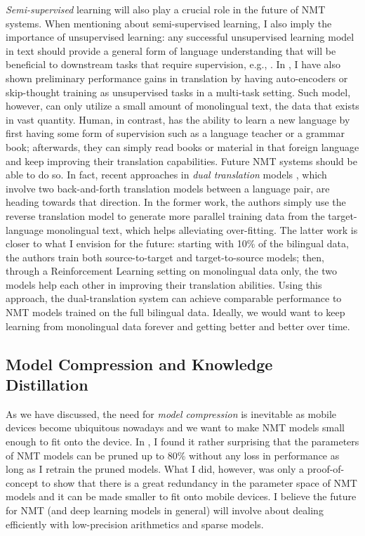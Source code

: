{\it Semi-supervised} learning will also play a crucial role in the future of NMT systems. When mentioning about semi-supervised learning, I also imply the importance of unsupervised learning: any successful unsupervised learning model in text should provide a general form of language understanding that will be beneficial to downstream tasks that require supervision, e.g., \cite{dai15}.
In , I have also shown preliminary performance gains in translation by having auto-encoders or skip-thought training as unsupervised tasks in a multi-task setting. Such model, however, can only utilize a small amount of monolingual text, the data that exists in vast quantity. Human, in contrast, has the ability to learn a new language by first having some form of supervision such as a language teacher or a grammar book; afterwards, they can simply read books or material in that foreign language and keep improving their translation capabilities. Future NMT systems should be able to do so. In fact, recent approaches in {\it dual translation} models \cite{sennrich16mono,xia16}, which involve two back-and-forth translation models between a language pair, are heading towards that direction. In the former work, the authors simply use the reverse translation model to generate more parallel training data from the target-language monolingual text, which helps alleviating over-fitting. The latter work is closer to what I envision for the future: starting with 10\% of the bilingual data, the authors train both source-to-target and target-to-source models; then, through a Reinforcement Learning setting on monolingual data only, the two models help each other in improving their translation abilities. Using this approach, the dual-translation system can achieve comparable performance to NMT models trained on the full bilingual data. Ideally, we would want to keep learning from monolingual data forever and getting better and better over time.

\subsection{Model Compression and Knowledge Distillation}
As we have discussed, the need for {\it model compression} is inevitable as mobile devices become ubiquitous nowadays and we want to make NMT models small enough to fit onto the device. In , I found it rather surprising that the parameters of NMT models can be pruned up to 80\% without any loss in performance as long as I retrain the pruned models. What I did, however, was only a proof-of-concept to show that there is a great redundancy in the parameter space of NMT models and it can be made smaller to fit onto mobile devices. I believe the future for NMT (and deep learning models in general) will involve about dealing efficiently with low-precision arithmetics \cite{courbariaux14,gupta15} and sparse models.

